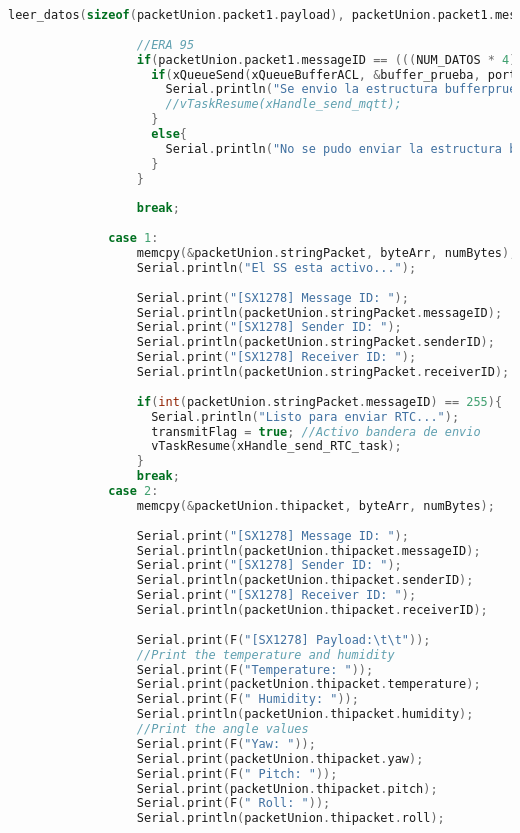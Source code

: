 \begin{lstlisting}[language=C++, caption=Tarea de recepción de datos de aceleración vía Lora en estación base]
                  leer_datos(sizeof(packetUnion.packet1.payload), packetUnion.packet1.messageID, packetUnion.packet1.senderID, packetUnion.packet1.receiverID, packetUnion.packet1.payload);
    
                  //ERA 95
                  if(packetUnion.packet1.messageID == (((NUM_DATOS * 4))*3 / 128) - 1){
                    if(xQueueSend(xQueueBufferACL, &buffer_prueba, portMAX_DELAY)){
                      Serial.println("Se envio la estructura bufferprueba a la cola xQueueBufferACL");
                      //vTaskResume(xHandle_send_mqtt);
                    }
                    else{
                      Serial.println("No se pudo enviar la estructura bufferprueba a la cola xQueueBufferACL");
                    }
                  }
    
                  break;
    
              case 1:
                  memcpy(&packetUnion.stringPacket, byteArr, numBytes);
                  Serial.println("El SS esta activo...");
    
                  Serial.print("[SX1278] Message ID: ");
                  Serial.println(packetUnion.stringPacket.messageID);
                  Serial.print("[SX1278] Sender ID: ");
                  Serial.println(packetUnion.stringPacket.senderID);
                  Serial.print("[SX1278] Receiver ID: ");
                  Serial.println(packetUnion.stringPacket.receiverID);
    
                  if(int(packetUnion.stringPacket.messageID) == 255){
                    Serial.println("Listo para enviar RTC...");
                    transmitFlag = true; //Activo bandera de envio
                    vTaskResume(xHandle_send_RTC_task);
                  }
                  break;
              case 2:
                  memcpy(&packetUnion.thipacket, byteArr, numBytes);
    
                  Serial.print("[SX1278] Message ID: ");
                  Serial.println(packetUnion.thipacket.messageID);
                  Serial.print("[SX1278] Sender ID: ");
                  Serial.println(packetUnion.thipacket.senderID);
                  Serial.print("[SX1278] Receiver ID: ");
                  Serial.println(packetUnion.thipacket.receiverID);
    
                  Serial.print(F("[SX1278] Payload:\t\t"));
                  //Print the temperature and humidity
                  Serial.print(F("Temperature: "));
                  Serial.print(packetUnion.thipacket.temperature);
                  Serial.print(F(" Humidity: "));
                  Serial.println(packetUnion.thipacket.humidity);
                  //Print the angle values
                  Serial.print(F("Yaw: "));
                  Serial.print(packetUnion.thipacket.yaw);
                  Serial.print(F(" Pitch: "));
                  Serial.print(packetUnion.thipacket.pitch);
                  Serial.print(F(" Roll: "));
                  Serial.println(packetUnion.thipacket.roll);
    

\end{lstlisting}
